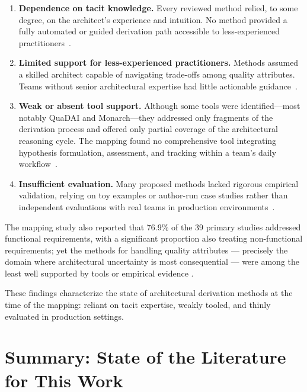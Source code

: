 \begin{enumerate}
  \item \textbf{Dependence on tacit knowledge.} Every reviewed method relied, to some
  degree, on the architect's experience and intuition. No method provided a fully
  automated or guided derivation path accessible to less-experienced practitioners~\citep{souza2019}.

  \item \textbf{Limited support for less-experienced practitioners.} Methods assumed a
  skilled architect capable of navigating trade-offs among quality attributes. Teams without senior architectural expertise had little actionable guidance~\citep{souza2019}.

  \item \textbf{Weak or absent tool support.} Although some tools were identified—most
  notably QuaDAI and Monarch—they addressed only fragments of the derivation process
  and offered only partial coverage of the architectural reasoning cycle. The mapping
  found no comprehensive tool integrating hypothesis formulation, assessment, and
  tracking within a team's daily workflow~\citep{souza2019}.

  \item \textbf{Insufficient evaluation.} Many proposed methods lacked rigorous
  empirical validation, relying on toy examples or author-run case studies rather than
  independent evaluations with real teams in production
  environments~\citep{souza2019}.
\end{enumerate}

The mapping study also reported that 76.9\% of the 39 primary studies addressed functional
requirements, with a significant proportion also treating non-functional requirements;
yet the methods for handling quality attributes — precisely the domain where architectural
uncertainty is most consequential — were among the least well supported by tools or
empirical evidence \citep{souza2019}.

These findings characterize the state of architectural derivation methods at the time of
the mapping: reliant on tacit expertise, weakly tooled, and thinly evaluated in
production settings.

\section{Summary: State of the Literature for This Work}
\label{sec:background-summary}

